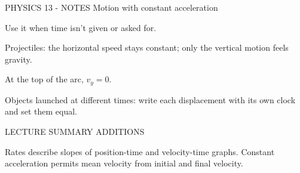 PHYSICS 13 - NOTES
Motion with constant acceleration

Use it when time isn't given or asked for.

Projectiles: the horizontal speed stays constant; only the vertical motion feels gravity.

At the top of the arc, \(v_y = 0\).

Objects launched at different times: write each displacement with its own clock and set them equal.

LECTURE SUMMARY ADDITIONS

Rates describe slopes of position-time and velocity-time graphs. Constant acceleration permits mean velocity from initial and final velocity.
